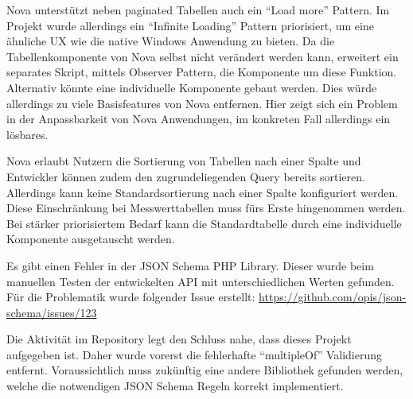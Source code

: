 \newpage

Nova unterstützt neben paginated Tabellen auch ein \enquote{Load more} Pattern.
Im Projekt wurde allerdings ein \enquote{Infinite Loading} Pattern priorisiert, um eine ähnliche UX wie die native Windows Anwendung zu bieten.
Da die Tabellenkomponente von Nova selbst nicht verändert werden kann, erweitert ein separates Skript, mittels Observer Pattern, die Komponente um diese Funktion.
Alternativ könnte eine individuelle Komponente gebaut werden.
Dies würde allerdings zu viele Basisfeatures von Nova entfernen.
Hier zeigt sich ein Problem in der Anpassbarkeit von Nova Anwendungen, im konkreten Fall allerdings ein lösbares.

Nova erlaubt Nutzern die Sortierung von Tabellen nach einer Spalte und Entwickler können zudem den zugrundeliegenden Query bereits sortieren.
Allerdings kann keine Standardsortierung nach einer Spalte konfiguriert werden.
Diese Einschränkung bei Messwerttabellen muss fürs Erste hingenommen werden.
Bei stärker priorisiertem Bedarf kann die Standardtabelle durch eine individuelle Komponente ausgetauscht werden.

Es gibt einen Fehler in der JSON Schema PHP Library.
Dieser wurde beim manuellen Testen der entwickelten API mit unterschiedlichen Werten gefunden.
Für die Problematik wurde folgender Issue erstellt: \url{https://github.com/opis/json-schema/issues/123}

Die Aktivität im Repository legt den Schluss nahe, dass dieses Projekt aufgegeben ist.
Daher wurde vorerst die fehlerhafte \enquote{multipleOf} Validierung entfernt.
Voraussichtlich muss zukünftig eine andere Bibliothek gefunden werden, welche die notwendigen JSON Schema Regeln korrekt implementiert.
